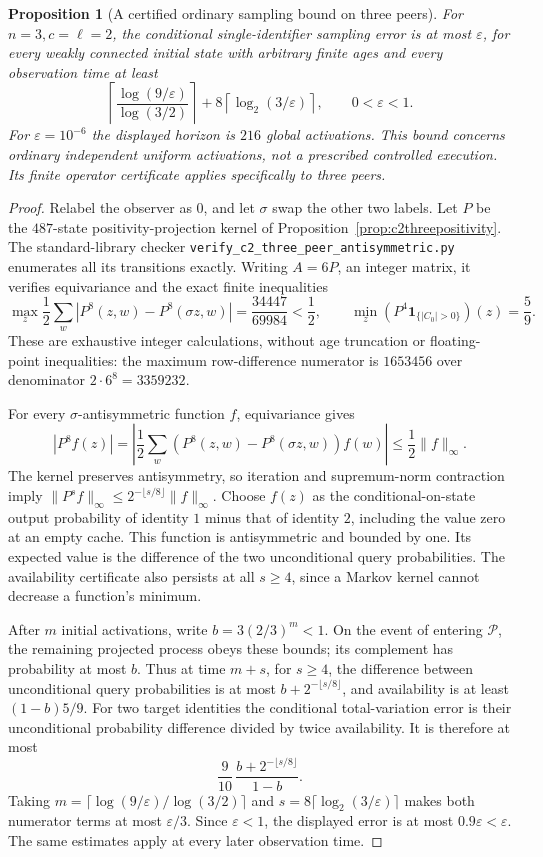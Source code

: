 \documentclass[11pt]{article}
\newtheorem{proposition}[theorem]{Proposition}
\begin{document}
\begin{proposition}[A certified ordinary sampling bound on three peers]
\label{prop:c2threeordinarysample}
For $n=3,c=\ell=2$, the conditional single-identifier sampling
error is at most $\varepsilon$, for every weakly connected
initial state with arbitrary finite ages and every observation
time at least
\[
 \left\lceil\frac{\log(9/\varepsilon)}{\log(3/2)}\right\rceil
 +8\left\lceil\log_2(3/\varepsilon)\right\rceil,
 \qquad 0<\varepsilon<1.
\]
For $\varepsilon=10^{-6}$ the displayed horizon is $216$
global activations. This bound concerns ordinary independent
uniform activations, not a prescribed controlled execution. Its finite operator
certificate applies specifically to three peers.
\end{proposition}
\begin{proof}
Relabel the observer as $0$, and let $\sigma$ swap the other
two labels. Let $P$ be the $487$-state positivity-projection
kernel of Proposition~\ref{prop:c2threepositivity}.
The standard-library checker
\texttt{verify\_c2\_three\_peer\_antisymmetric.py}
enumerates all its transitions exactly. Writing $A=6P$, an
integer matrix, it verifies equivariance and the exact
finite inequalities
\[
 \max_z\frac12\sum_w
   \left|P^8(z,w)-P^8(\sigma z,w)\right|
   =\frac{34447}{69984}<\frac12,
 \qquad
 \min_z(P^4\mathbf1_{\{|C_0|>0\}})(z)=\frac59.
\]
These are exhaustive integer calculations, without age
truncation or floating-point inequalities: the maximum
row-difference numerator is $1653456$ over denominator
$2\cdot6^8=3359232$.

For every $\sigma$-antisymmetric function $f$,
equivariance gives
\[
 |P^8f(z)|
 =\left|\frac12\sum_w
       (P^8(z,w)-P^8(\sigma z,w))f(w)\right|
 \le\frac12\|f\|_\infty.
\]
The kernel preserves antisymmetry, so iteration and
supremum-norm contraction imply
$\|P^sf\|_\infty\le2^{-\lfloor s/8\rfloor}\|f\|_\infty$.
Choose $f(z)$ as the conditional-on-state output probability
of identity $1$ minus that of identity $2$, including the
value zero at an empty cache. This function is antisymmetric
and bounded by one. Its expected value is the difference of
the two unconditional query probabilities.
The availability certificate also persists at all $s\ge4$,
since a Markov kernel cannot decrease a function's minimum.

After $m$ initial activations, write $b=3(2/3)^m<1$.
On the event of entering $\mathcal P$, the remaining projected
process obeys these bounds; its complement has probability
at most $b$. Thus at time $m+s$, for $s\ge4$, the difference
between unconditional query probabilities is at most
$b+2^{-\lfloor s/8\rfloor}$, and availability is at least
$(1-b)5/9$. For two target identities the conditional
total-variation error is their unconditional probability
difference divided by twice availability. It is therefore
at most
\[
 \frac9{10}\,
 \frac{b+2^{-\lfloor s/8\rfloor}}{1-b}.
\]
Taking $m=\lceil\log(9/\varepsilon)/\log(3/2)\rceil$ and
$s=8\lceil\log_2(3/\varepsilon)\rceil$ makes both numerator
terms at most $\varepsilon/3$. Since $\varepsilon<1$, the
displayed error is at most $0.9\varepsilon<\varepsilon$.
The same estimates apply at every later observation time.
\end{proof}
\end{document}
